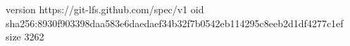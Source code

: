 version https://git-lfs.github.com/spec/v1
oid sha256:8930f903398daa583e6daedaef34b32f7b0542eb114295c8eeb2d1df4277c1ef
size 3262
